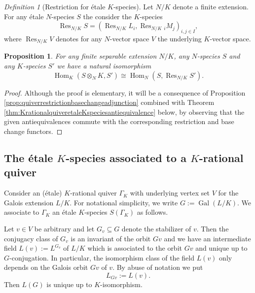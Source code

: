 \documentclass[a4paper,12pt,reqno]{amsart}
\DeclareMathOperator{\Hom}{\mathrm{Hom}}
\DeclareMathOperator{\Gal}{\mathrm {Gal}}
\DeclareMathOperator{\res}{\mathrm{Res}}
\theoremstyle{plain}
\newtheorem{proposition}[theorem]{Proposition}
\theoremstyle{remark}
\newtheorem{definition}[theorem]{Definition}
\begin{document}
  \begin{definition}[Restriction for \'etale $K$-species]\label{def:restrictionforspecies}
    Let $N/K$ denote a finite extension. For any \'etale $N$-species $S$ the consider the $K$-species
    \[
    \res_{N/K}S=(\res_{N/K} L_i,\res_{N/K}{}_iM_j)_{i,j\in I},
    \]
    where $\res_{N/K} V$ denotes for any $N$-vector space $V$ the underlying $K$-vector space.
  \end{definition}

  \begin{proposition}\label{prop:speciesrestrictionbasechangeadjunction}
    For any finite separable extension $N/K$, any $N$-species $S$ and any $K$-species $S'$ we have a natural isomorphism
    \begin{equation}
      \Hom_K(S\otimes_N K,S')\cong \Hom_N(S,\res_{N/K}S').
      \label{eq:restrictionadjunction}
    \end{equation}
  \end{proposition}

  \begin{proof}
    Although the proof is elementary, it will be a consequence of Proposition \ref{prop:quiverrestrictionbasechangeadjunction} combined with Theorem \ref{thm:KrationalquiveretaleKspeciesantiequivalence} below, by observing that the given antiequivalences commute with the corresponding restriction and base change functors.
  \end{proof}

  \subsection{The \'etale $K$-species associated to a $K$-rational quiver}

    Consider an (\'etale) $K$-rational quiver $\Gamma_K$ with underlying vertex set $V$ for the Galois extension $L/K$. For notational simplicity, we write $G:=\Gal(L/K)$. We associate to $\Gamma_K$ an \'etale $K$-species $S(\Gamma_K)$ as follows.

  Let $v\in V$ be arbitrary and let $G_v\subseteq G$ denote the stabilizer of $v$. Then the conjugacy class of $G_v$ is an invariant of the orbit $Gv$ and we have an intermediate field $L(v):=L^{G_v}$ of $L/K$ which is associated to the orbit $Gv$ and unique up to $G$-conjugation. In particular, the isomorphism class of the field $L(v)$ only depends on the Galois orbit $Gv$ of $v$. By abuse of notation we put
  \begin{equation}
    L_{Gv}:=L(v).
    \label{eq:abusivedefinitionofLv}
  \end{equation}
  Then $L(G)$ is unique up to $K$-isomorphism.
\end{document}
